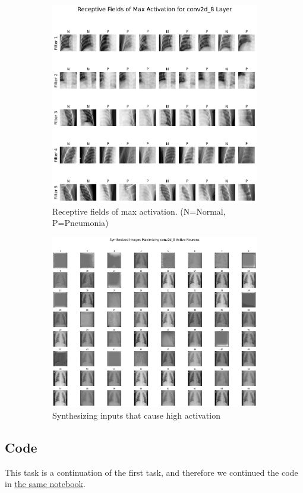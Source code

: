 \documentclass{article}
\begin{document}
\begin{figure}
     \centering
     \begin{subfigure}[b]{0.45\textwidth}
         \centering
         \includegraphics[width=1.0\linewidth, angle=0]{receptive_fields.png}
          \caption{Receptive fields of max activation. (N=Normal, P=Pneumonia)}
          \label{fig:receptive_fields}
     \end{subfigure}
     \hfill
     \begin{subfigure}[b]{0.45\textwidth}
         \centering
         \includegraphics[width=1.1\linewidth, angle=0]{synth_images.png}
          \caption{Synthesizing inputs that cause high activation}
          \label{fig:synth_images}
     \end{subfigure}
     
        \caption{}
        \label{fig:three Explainability approaches}
\end{figure}


\subsection{Code}

This task is a continuation of the first task, and therefore we continued the code in \href{https://www.kaggle.com/code/nitsanbh/lungs-x-ray}{the same notebook}.



\end{document}
